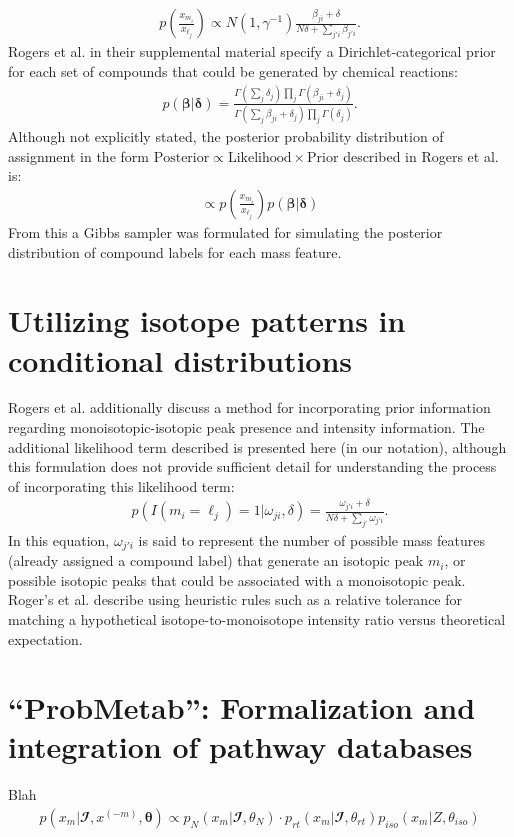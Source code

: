 \begin{DoubleSpace*}
\begin{align}
	p\left(\frac{x_{m_i}}{x_{\ell_j}}\right) \propto N(1, \gamma^{-1})  \frac{\beta_{ji}+\delta}{N\delta+\sum_{j'i} \beta_{j'i}}.
\end{align}
Rogers et al. in their supplemental material specify a Dirichlet-categorical prior for each set of compounds that could be generated by chemical reactions:
\begin{align}
	p(\boldsymbol{\beta}|\boldsymbol{\delta})=\frac{\Gamma(\sum_j \delta_j) \prod_j \Gamma(\beta_{ji}+\delta_j)}{\Gamma(\sum_j \beta_{ji}+\delta_j) \prod_j \Gamma(\delta_j)}.
\end{align}
Although not explicitly stated, the posterior probability distribution of assignment in the form $\text{Posterior} \propto \text{Likelihood} \times \text{Prior}$ described in Rogers et al. is:
\begin{align}
	\propto p\left(\frac{x_{m_i}}{x_{\ell_j}}\right) p(\boldsymbol{\beta}|\boldsymbol{\delta})
\end{align}
From this a Gibbs sampler was formulated for simulating the posterior distribution of compound labels for each mass feature. 

\section{Utilizing isotope patterns in conditional distributions}
Rogers et al. \cite{rogers2009} additionally discuss a method for incorporating prior information regarding monoisotopic-isotopic peak presence and intensity information. The additional likelihood term described is presented here (in our notation), although this formulation does not provide sufficient detail for understanding the process of incorporating this likelihood term:
\begin{align*}
p( I(m_i=\ell_j )=1|\omega_{ji},\delta) = \frac{\omega_{j'i}+\delta}{N \delta + \sum_{j'}\omega_{j'i}}.
\end{align*}
In this equation, $\omega_{j'i}$ is said to represent the number of possible mass features (already assigned a compound label) that generate an isotopic peak $m_i$, or possible isotopic peaks that could be associated with a monoisotopic peak. Roger's et al. describe using heuristic rules such as a relative tolerance for matching a hypothetical isotope-to-monoisotope intensity ratio versus theoretical expectation.

\section{``ProbMetab'': Formalization and integration of pathway databases}
Blah 
\begin{align}
	p(x_m|\mathbfcal{I},x^{(-m)},\boldsymbol{\theta}) \propto p_N(x_m|\mathbfcal{I},\theta_N) \cdot p_{rt}(x_m|\mathbfcal{I},\theta_{rt}) p_{iso}(x_m|Z,\theta_{iso})
\end{align}

\end{DoubleSpace*}